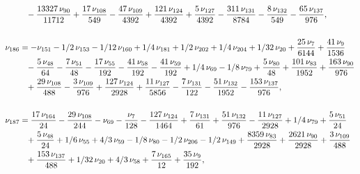 \documentclass[a4paper,12pt, DIV=14, BCOR=5mm, twoside, headsepline, numbers=noenddot]{scrbook}
\begin{document}
\begin{align}
\begin{aligned}
 &\hphantom{=}-{\frac {13327\,\nu_{{90
}}}{11712}}+{\frac {17\,\nu_{{108}}}{549}}-{\frac {47\,\nu_{{109}}}{
4392}}+{\frac {121\,\nu_{{124}}}{4392}}+{\frac {5\,\nu_{{127}}}{4392}}
-{\frac {311\,\nu_{{131}}}{8784}}-{\frac {8\,\nu_{{132}}}{549}}-{
\frac {65\,\nu_{{137}}}{976}}, \\
\\
\nu_{{186}}&=-\nu_{{151}}-1/2\,\nu_{{153}
}-1/12\,\nu_{{160}}+1/4\,\nu_{{181}}+1/2\,\nu_{{202}}+1/4\,\nu_{{204}}
+1/32\,\nu_{{20}}+{\frac {25\,\nu_{{7}}}{6144}}+{\frac {41\,\nu_{{9}}
}{1536}}\\
 &\hphantom{=}-{\frac {5\,\nu_{{48}}}{64}}-{\frac {7\,\nu_{{51}}}{48}}-{
\frac {17\,\nu_{{55}}}{192}}-{\frac {41\,\nu_{{58}}}{192}}-{\frac {41
\,\nu_{{59}}}{192}}+1/4\,\nu_{{69}}-1/8\,\nu_{{79}}+{\frac {5\,\nu_{{
80}}}{48}}+{\frac {101\,\nu_{{83}}}{1952}}+{\frac {163\,\nu_{{90}}}{
976}}\\
 &\hphantom{=}+{\frac {29\,\nu_{{108}}}{488}}-{\frac {3\,\nu_{{109}}}{976}}+{
\frac {127\,\nu_{{124}}}{2928}}+{\frac {11\,\nu_{{127}}}{5856}}-{
\frac {7\,\nu_{{131}}}{122}}-{\frac {51\,\nu_{{132}}}{1952}}-{\frac {
153\,\nu_{{137}}}{976}}, \\
\\
\nu_{{187}}&={\frac {17\,\nu_{{164}}}{24}}-{
\frac {29\,\nu_{{108}}}{244}}-\nu_{{69}}-{\frac {\nu_{{7}}}{128}}-{
\frac {127\,\nu_{{124}}}{1464}}+{\frac {7\,\nu_{{131}}}{61}}+{\frac {
51\,\nu_{{132}}}{976}}-{\frac {11\,\nu_{{127}}}{2928}}+1/4\,\nu_{{79}}
+{\frac {5\,\nu_{{51}}}{24}}\\
 &\hphantom{=}+{\frac {5\,\nu_{{48}}}{24}}+1/6\,\nu_{{55
}}+4/3\,\nu_{{59}}-1/8\,\nu_{{80}}-1/2\,\nu_{{206}}-1/2\,\nu_{{149}}+{
\frac {8359\,\nu_{{83}}}{2928}}+{\frac {2621\,\nu_{{90}}}{2928}}+{
\frac {3\,\nu_{{109}}}{488}}\\
 &\hphantom{=}+{\frac {153\,\nu_{{137}}}{488}}+1/32\,\nu
_{{20}}+4/3\,\nu_{{58}}+{\frac {7\,\nu_{{165}}}{12}}+{\frac {35\,\nu_{
{9}}}{192}}, 
\end{aligned}
\end{align}
\end{document}
